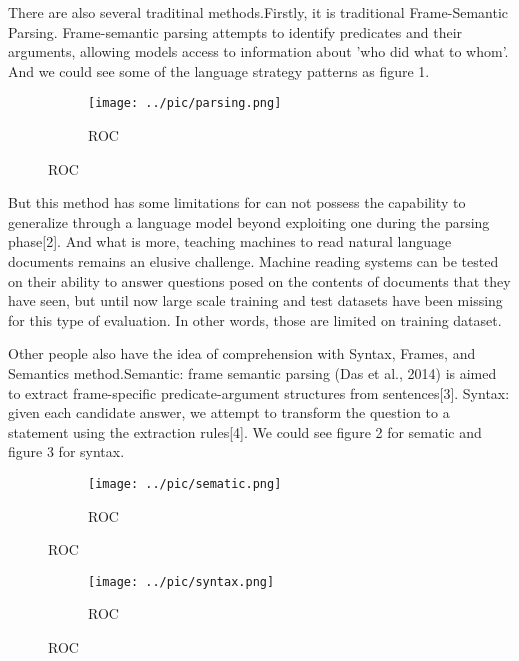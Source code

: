\documentclass[runningheads,a4paper]{llncs}
\begin{document}
There are also several traditinal methods.Firstly, it is traditional Frame-Semantic Parsing. Frame-semantic parsing attempts to identify predicates and their arguments, allowing models access to information about 'who did what to whom'. And we could see some of the language strategy patterns as figure 1.

\begin{figure}[p]
	\centering
	\begin{subfigure}{.5\textwidth}
		\centering
		\texttt{[image: ../pic/parsing.png]}
		\caption{ROC}
		\label{figure 1:Frame-Semantic Parsing}
	\end{subfigure}
	
\end{figure}

But this method has some limitations for can not possess the capability to generalize through a language model beyond exploiting one during the parsing phase[2]. And what is more, teaching machines to read natural language documents remains an elusive challenge. Machine reading systems can be tested on their ability to answer questions posed on the contents of documents that they have seen, but until now large scale training and test datasets have been missing for this type of evaluation. In other words, those are limited on training dataset.

Other people also have the idea of comprehension with Syntax, Frames, and Semantics method.Semantic: frame semantic parsing (Das et al., 2014) is aimed to extract frame-specific predicate-argument structures from sentences[3].
Syntax: given each candidate answer, we attempt to transform the question to a statement using the extraction rules[4]. We could see figure 2 for sematic and figure 3 for syntax.
\begin{figure}[p]
	\centering
	\begin{subfigure}{.5\textwidth}
		\centering
		\texttt{[image: ../pic/sematic.png]}
		\caption{ROC}
		\label{figure 2:sematic parsing}
	\end{subfigure}
	
\end{figure}

\begin{figure}[p]
	\centering
	\begin{subfigure}{.5\textwidth}
		\centering
		\texttt{[image: ../pic/syntax.png]}
		\caption{ROC}
		\label{figure 3:syntax}
	\end{subfigure}
	
\end{figure}
\end{document}
